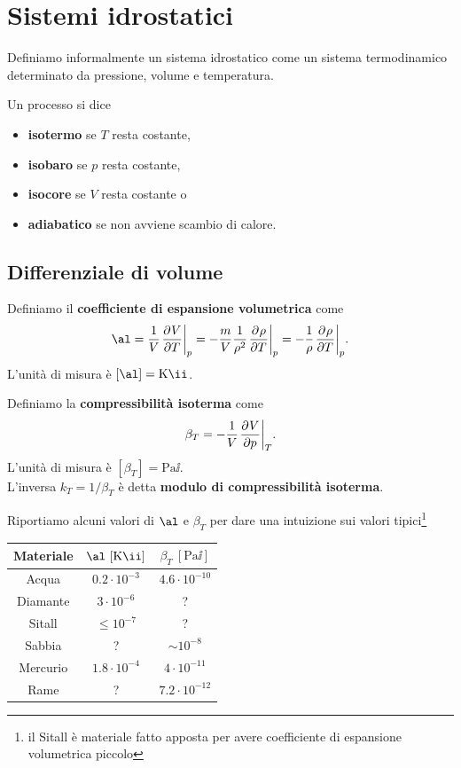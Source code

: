 \chapter{Sistemi idrostatici}
Definiamo informalmente un sistema idrostatico come un sistema termodinamico determinato da pressione, volume e temperatura.


\begin{definition}
Un processo si dice
\begin{itemize}
\item \textbf{isotermo} se $T$ resta costante,
\item \textbf{isobaro} se $p$ resta costante,
\item \textbf{isocore} se $V$ resta costante o
\item \textbf{adiabatico} se non avviene scambio di calore.
\end{itemize}
\end{definition}

\section{Differenziale di volume}
\begin{definition}
Definiamo il \textbf{coefficiente di espansione volumetrica} come
\[\al=\frac1V\ppb TVp=-\frac mV\frac1{\rho^2}\ppb T\rho p=-\frac1\rho\ppb T\rho p.\]
L'unit\`a di misura \`e $[\al]=\mathrm{K}\ii$.
\end{definition}


\begin{definition}
Definiamo la \textbf{compressibilit\`a isoterma} come
\[\beta_T=-\frac1V\ppb pVT.\]
L'unit\`a di misura \`e $[\beta_T]=\mathrm{Pa}\ii$.\\
L'inversa $k_T=1/\beta_T$ \`e detta \textbf{modulo di compressibilit\`a isoterma}.
\end{definition}

\noindent Riportiamo alcuni valori di $\al$ e $\beta_T$ per dare una intuizione sui valori tipici\footnote{il Sitall \`e materiale fatto apposta per avere coefficiente di espansione volumetrica piccolo}
\begin{center}
\begin{tabular}[ht]{|c|c|c|}
\hline 
Materiale&$\al\ [\mathrm{K}\ii]$&$\beta_T\ [\mathrm{Pa}\ii]$\\\hline
Acqua&$0.2\cdot 10^{-3}$&$4.6\cdot 10^{-10}$\\
Diamante&$3\cdot 10^{-6}$&?\\
Sitall&$\leq 10^{-7}$&?\\
Sabbia&?&$\sim10^{-8}$\\
Mercurio&$1.8\cdot 10^{-4}$&$4\cdot10^{-11}$\\
Rame&?&$7.2\cdot10^{-12}$\\
\hline
\end{tabular}
\end{center}


